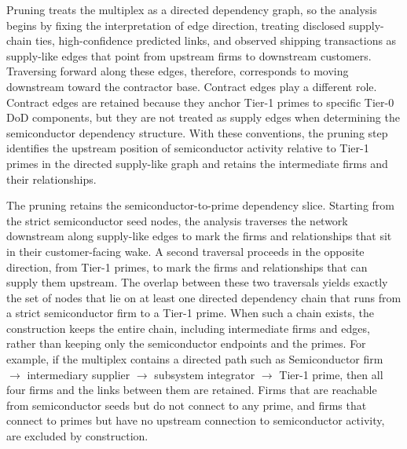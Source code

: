 Pruning treats the multiplex as a directed dependency graph, so the analysis begins by fixing the interpretation of edge direction, treating disclosed supply-chain ties, high-confidence predicted links, and observed shipping transactions as supply-like edges that point from upstream firms to downstream customers. Traversing forward along these edges, therefore, corresponds to moving downstream toward the contractor base. Contract edges play a different role. Contract edges are retained because they anchor Tier-1 primes to specific Tier-0 DoD components, but they are not treated as supply edges when determining the semiconductor dependency structure. With these conventions, the pruning step identifies the upstream position of semiconductor activity relative to Tier-1 primes in the directed supply-like graph and retains the intermediate firms and their relationships.

The pruning retains the semiconductor-to-prime dependency slice. Starting from the strict semiconductor seed nodes, the analysis traverses the network downstream along supply-like edges to mark the firms and relationships that sit in their customer-facing wake. A second traversal proceeds in the opposite direction, from Tier-1 primes, to mark the firms and relationships that can supply them upstream. The overlap between these two traversals yields exactly the set of nodes that lie on at least one directed dependency chain that runs from a strict semiconductor firm to a Tier-1 prime. When such a chain exists, the construction keeps the entire chain, including intermediate firms and edges, rather than keeping only the semiconductor endpoints and the primes. For example, if the multiplex contains a directed path such as Semiconductor firm $\rightarrow$ intermediary supplier $\rightarrow$ subsystem integrator $\rightarrow$ Tier-1 prime, then all four firms and the links between them are retained. Firms that are reachable from semiconductor seeds but do not connect to any prime, and firms that connect to primes but have no upstream connection to semiconductor activity, are excluded by construction.

